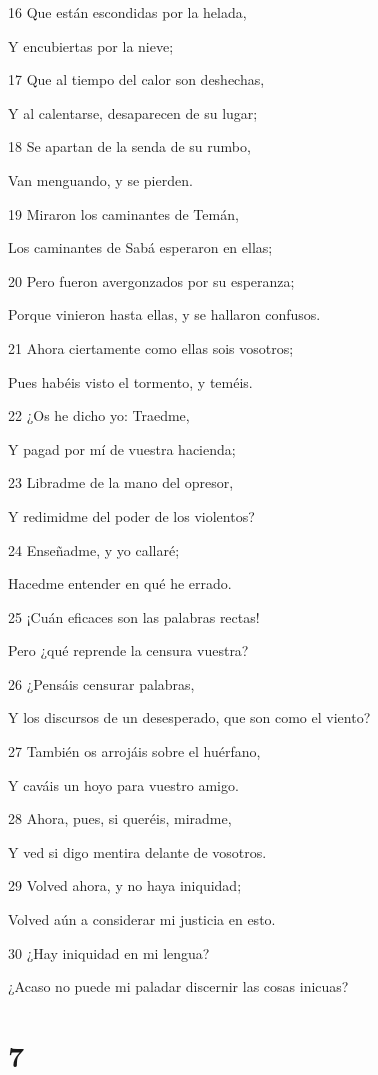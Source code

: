 \par 16 Que están escondidas por la helada,
\par Y encubiertas por la nieve;
\par 17 Que al tiempo del calor son deshechas,
\par Y al calentarse, desaparecen de su lugar;
\par 18 Se apartan de la senda de su rumbo,
\par Van menguando, y se pierden.
\par 19 Miraron los caminantes de Temán,
\par Los caminantes de Sabá esperaron en ellas;
\par 20 Pero fueron avergonzados por su esperanza;
\par Porque vinieron hasta ellas, y se hallaron confusos.
\par 21 Ahora ciertamente como ellas sois vosotros;
\par Pues habéis visto el tormento, y teméis.
\par 22 ¿Os he dicho yo: Traedme,
\par Y pagad por mí de vuestra hacienda;
\par 23 Libradme de la mano del opresor,
\par Y redimidme del poder de los violentos? 
\par 24 Enseñadme, y yo callaré;
\par Hacedme entender en qué he errado.
\par 25 ¡Cuán eficaces son las palabras rectas!
\par Pero ¿qué reprende la censura vuestra?
\par 26 ¿Pensáis censurar palabras,
\par Y los discursos de un desesperado, que son como el viento?
\par 27 También os arrojáis sobre el huérfano,
\par Y caváis un hoyo para vuestro amigo.
\par 28 Ahora, pues, si queréis, miradme,
\par Y ved si digo mentira delante de vosotros.
\par 29 Volved ahora, y no haya iniquidad;
\par Volved aún a considerar mi justicia en esto.
\par 30 ¿Hay iniquidad en mi lengua?
\par ¿Acaso no puede mi paladar discernir las cosas inicuas?

\chapter{7}

